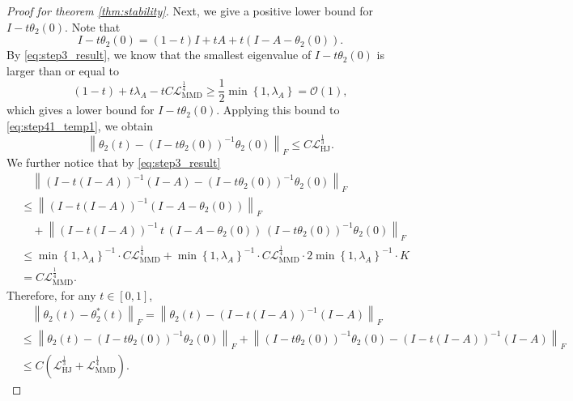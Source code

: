 \documentclass{article} %
\theoremstyle{plain}
\theoremstyle{definition}
\theoremstyle{remark}
\newcommand{\cO}{\mathcal{O}}
\newcommand{\norm}[2][H^s]{\left\|#2\right\|_{#1}}
\newcommand{\LMMD}{\mathcal{L}_{\text{MMD}}}
\newcommand{\LHJ}{\mathcal{L}_{\text{HJ}}}
\newcommand{\lam}{\lambda}
\newcommand{\parentheses}[1]{\left(#1\right)}
\newcommand{\curlybra}[1]{\left\{#1\right\}}
\begin{document}
\begin{proof}[Proof for theorem \ref{thm:stability}]
Next, we give a positive lower bound for $I-t\theta_2(0)$. Note that
$$I-t\theta_2(0) = (1-t)I + tA + t(I-A-\theta_2(0)).$$
By \eqref{eq:step3_result}, we know that the smallest eigenvalue of $I-t\theta_2(0)$ is larger than or equal to
$$(1-t)+t\lam_A - tC\LMMD^{\frac14} \ge \frac12 \min\curlybra{1,\lam_A} = \cO(1),$$
which gives a lower bound for $I-t\theta_2(0)$. Applying this bound to \eqref{eq:step41_temp1}, we obtain
\begin{equation}\label{eq:step41_temp2}
\norm[F]{\theta_2(t) - (I-t\theta_2(0))^{-1} \theta_2(0)} \le C \LHJ^{\frac13}.
\end{equation}
We further notice that by \eqref{eq:step3_result}
\begin{align*}
& \quad \norm[F]{\parentheses{I - t(I-A)}^{-1}(I-A) - \parentheses{I - t\theta_2(0)}^{-1}\theta_2(0)} \\
& \le \norm[F]{\parentheses{I - t(I-A)}^{-1}(I-A - \theta_2(0))} \\
& \quad + \norm[F]{\parentheses{I - t(I-A)}^{-1}\, t\, (I-A-\theta_2(0))\,  \parentheses{I - t\theta_2(0)}^{-1} \theta_2(0)} \\
& \le \min\curlybra{1,\lam_A}^{-1} \cdot C \LMMD^{\frac14} + \min\curlybra{1,\lam_A}^{-1} \cdot C \LMMD^{\frac14} \cdot 2\min\curlybra{1,\lam_A}^{-1} \cdot K \\
& = C \LMMD^{\frac14}.
\end{align*}
Therefore, for any $t\in[0,1]$,
\begin{equation}\label{eq:u2_err_result}
\begin{aligned}
& \quad \norm[F]{\theta_2(t)-\theta_2^*(t)} = \norm[F]{\theta_2(t)-\parentheses{I - t(I-A)}^{-1}(I-A)} \\
& \le \norm[F]{\theta_2(t)-\parentheses{I - t\theta_2(0)}^{-1}\theta_2(0)} + \norm[F]{\parentheses{I - t\theta_2(0)}^{-1}\theta_2(0)-\parentheses{I - t(I-A)}^{-1}(I-A)} \\
& \le C \parentheses{\LHJ^{\frac13} + \LMMD^{\frac14}}.
\end{aligned}
\end{equation}


\end{proof}
\end{document}
